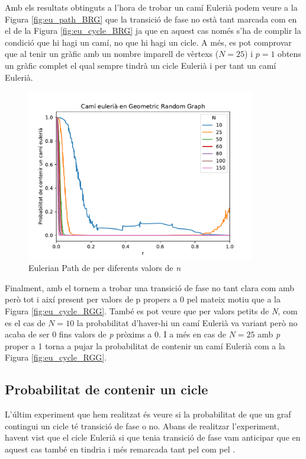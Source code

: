 Amb els resultats obtinguts a l'hora de trobar un camí Eulerià podem veure a la Figura \ref{fig:eu_path_BRG} que la transició de fase no està tant marcada com en el de la Figura \ref{fig:eu_cycle_BRG} ja que en aquest cas només s'ha de complir la condició que hi hagi un camí, no que hi hagi un cicle. A més, es pot comprovar que al tenir un gràfic amb un nombre imparell de vèrtexs ($N=25$) i $p=1$ obtens un gràfic complet el qual sempre tindrà un cicle Eulerià i per tant un camí Eulerià.

\begin{figure}[H]
    \centering
    \includegraphics[width=10cm]{plots/GRG_eulerianPath.pdf}
    \caption{Eulerian Path de \RGG per diferents valors de \textit{n}}
    \label{fig:eu_path_RGG}
\end{figure}

Finalment, amb el \RGG tornem a trobar una transició de fase no tant clara com amb \BRG però tot i així present per valors de p propers a 0 pel mateix motiu que a la Figura \ref{fig:eu_cycle_RGG}. També es pot veure que per valors petits de \textit{N}, com es el cas de $N=10$ la probabilitat d'haver-hi un camí Eulerià va variant però no acaba de ser 0 fins valors de \textit{p} pròxims a 0. I a més en cas de $N=25$ amb \textit{p} proper a 1 torna a pujar la probabilitat de contenir un camí Eulerià com a la Figura \ref{fig:eu_cycle_RGG}.

\subsection{Probabilitat de contenir un cicle}
L'últim experiment que hem realitzat és veure si la probabilitat de que un graf contingui un cicle té transició de fase o no. Abans de realitzar l'experiment, havent vist que el cicle Eulerià si que tenia transició de fase vam anticipar que en aquest cas també en tindria i més remarcada tant pel \BRG com pel \RGG.

